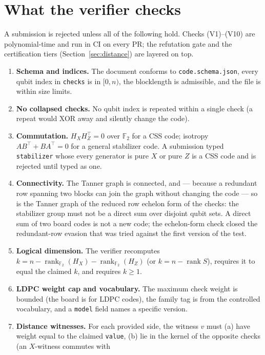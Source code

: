 \documentclass[11pt]{article}
\newcommand{\GF}{\mathbb{F}_2}
\newcommand{\HX}{H_X}
\newcommand{\HZ}{H_Z}
\newcommand{\rank}{\operatorname{rank}}
\begin{document}
	\section{What the verifier checks}
	\label{sec:checks}

	A submission is rejected unless all of the following hold. Checks
	(V1)--(V10) are polynomial-time and run in CI on every PR; the refutation
	gate and the certification tiers (Section~\ref{sec:distance}) are layered
	on top.
	\begin{enumerate}[label=(V\arabic*),leftmargin=*,nosep]
		\item \textbf{Schema and indices.} The document conforms to
		\texttt{code.schema.json}, every qubit index in \texttt{checks} is in
		$[0,n)$, the blocklength is admissible, and the file is within size
		limits.
		\item \textbf{No collapsed checks.} No qubit index is repeated within
		a single check (a repeat would XOR away and silently change the code).
		\item \textbf{Commutation.} $\HX\HZ^{\!\top}=0$ over $\GF$ for a CSS
		code; isotropy $AB^{\top}+BA^{\top}=0$ for a general stabilizer code.
		A submission typed \texttt{stabilizer} whose every generator is pure
		$X$ or pure $Z$ is a CSS code and is rejected until typed as one.
		\item \textbf{Connectivity.} The Tanner graph is connected, and ---
		because a redundant row spanning two blocks can join the graph without
		changing the code --- so is the Tanner graph of the reduced row
		echelon form of the checks: the stabilizer group must not be a direct
		sum over disjoint qubit sets. A direct sum of two board codes is not a
		new code; the echelon-form check closed the redundant-row evasion
		that was tried against the first version of the test.
		\item \textbf{Logical dimension.} The verifier recomputes
		$k = n-\rank_{\GF}(\HX)-\rank_{\GF}(\HZ)$ (or $k=n-\rank S$),
		requires it to equal the claimed $k$, and requires $k\ge 1$.
		\item \textbf{LDPC weight cap and vocabulary.} The maximum check
		weight is bounded (the board is for LDPC codes), the family tag is
		from the controlled vocabulary, and a \texttt{model} field names a
		specific version.
		\item \textbf{Distance witnesses.} For each provided side, the witness
		$v$ must (a) have weight equal to the claimed \texttt{value}, (b) lie
		in the kernel of the opposite checks (an $X$-witness commutes with

\end{enumerate}
\end{document}
